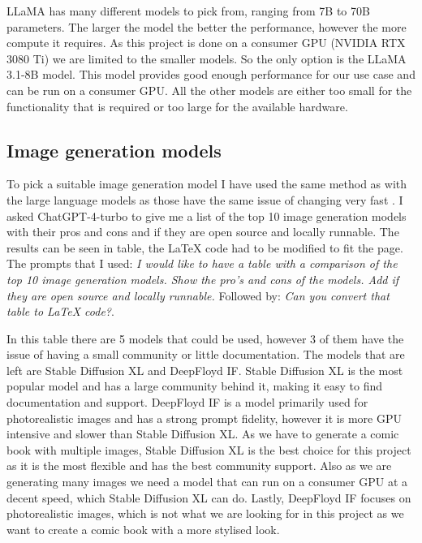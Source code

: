LLaMA has many different models to pick from, ranging from 7B to 70B parameters. The larger the model the better the performance, however the more compute it requires. As this project is done on a consumer GPU (NVIDIA RTX 3080 Ti) we are limited to the smaller models. So the only option is the LLaMA 3.1-8B model. This model provides good enough performance for our use case and can be run on a consumer GPU. All the other models are either too small for the functionality that is required or too large for the available hardware.

\subsection{Image generation models}
To pick a suitable image generation model I have used the same method as with the large language models as those have the same issue of changing very fast \cite{bie2024renaissance}. I asked ChatGPT-4-turbo to give me a list of the top 10 image generation models with their pros and cons and if they are open source and locally runnable. The results can be seen in table, the LaTeX code had to be modified to fit the page. The prompts that I used: \textit{I would like to have a table with a comparison of the top 10 image generation
models. Show the pro's and cons of the models. Add if they are open source and locally runnable.} Followed by: \textit{Can you convert that table to LaTeX code?}.

In this table there are 5 models that could be used, however 3 of them have the issue of having a small community or little documentation. The models that are left are Stable Diffusion XL and DeepFloyd IF. Stable Diffusion XL is the most popular model and has a large community behind it, making it easy to find documentation and support. DeepFloyd IF is a model primarily used for photorealistic images and has a strong prompt fidelity, however it is more GPU intensive and slower than Stable Diffusion XL. As we have to generate a comic book with multiple images, Stable Diffusion XL is the best choice for this project as it is the most flexible and has the best community support. Also as we are generating many images we need a model that can run on a consumer GPU at a decent speed, which Stable Diffusion XL can do. Lastly, DeepFloyd IF focuses on photorealistic images, which is not what we are looking for in this project as we want to create a comic book with a more stylised look.

